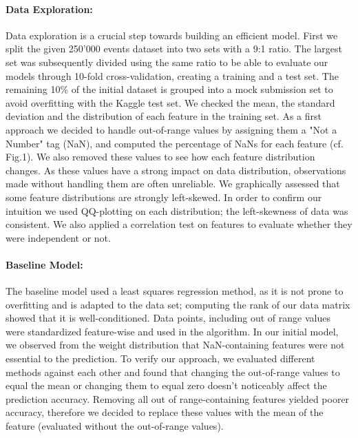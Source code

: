 \documentclass[10pt,a4paper]{article}
\begin{document}
\paragraph{Data Exploration:}Data exploration is a crucial step towards building an efficient model. First we split the given 250'000 events dataset into two sets with a 9:1 ratio. The largest set was subsequently divided using the same ratio to be able to evaluate our models through 10-fold cross-validation, creating a training and a test set. The remaining 10\% of the initial dataset is grouped into a mock submission set to avoid overfitting with the Kaggle test set. We checked the mean, the standard deviation and the distribution of each feature in the training set. As a first approach we decided to handle out-of-range values by assigning them a "Not a Number" tag (NaN), and computed the percentage of NaNs for each feature (cf. Fig.1). We also removed these values to see how each feature distribution changes. As these values have a strong impact on data distribution, observations made without handling them are often unreliable. We graphically assessed that some feature distributions are strongly left-skewed. In order to confirm our intuition we used QQ-plotting on each distribution; the left-skewness of data was consistent. We also applied a correlation test on features to evaluate whether they were independent or not.

\paragraph{Baseline Model:}The baseline model used a least squares regression method, as it is not prone to overfitting and is adapted to the data set; computing the rank of our data matrix showed that it is well-conditioned. Data points, including out of range values were standardized feature-wise and used in the algorithm. In our initial model, we observed from the weight distribution that NaN-containing features were not essential to the prediction. To verify our approach, we evaluated different methods against each other and found that changing the out-of-range values to equal the mean or changing them to equal zero doesn't noticeably affect the prediction accuracy. Removing all out of range-containing features yielded poorer accuracy, therefore we decided to replace these values with the mean of the feature (evaluated without the out-of-range values). 
\end{document}
